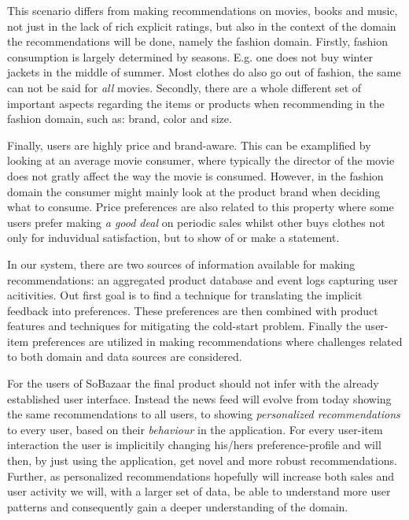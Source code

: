 This scenario differs from making recommendations on movies, books and music,
not just in the lack of rich explicit ratings, but also in the context of the
domain the recommendations will be done, namely the fashion domain. Firstly,
fashion consumption is largely determined by seasons. E.g. one does not buy
winter jackets in the middle of summer. Most clothes do also go out of
fashion, the same can not be said for \emph{all} movies. Secondly, there are a
whole different set of important aspects regarding the items or products when
recommending in the fashion domain, such as: brand, color and size. 

Finally, users are highly price and brand-aware. This can be examplified by
looking at an average movie consumer, where typically the director of the movie
does not gratly affect the way the movie is consumed. However, in the fashion
domain the consumer might mainly look at the product brand when deciding what
to consume. Price preferences are also related to this property where some
users prefer making \textit{a good deal} on periodic sales whilst other buys
clothes not only for induvidual satisfaction, but to show of or make a
statement.

In our system, there are two sources of information available for making
recommendations: an aggregated product database and event logs capturing user
acitivities. Out first goal is to find a technique for translating the implicit
feedback into preferences. These preferences are then combined with product
features and techniques for mitigating the cold-start problem. Finally the
user-item preferences are utilized in making recommendations where challenges
related to both domain and data sources are considered.

For the users of SoBazaar the final product should not infer with the already
established user interface. Instead the news feed will evolve from today
showing the same recommendations to all users, to showing \textit{personalized
recommendations} to every user, based on their \textit{behaviour} in the
application. For every user-item interaction the user is implicitily changing
his/hers preference-profile and will then, by just using the application, get
novel and more robust recommendations. Further, as personalized recommendations
hopefully will increase both sales and user activity we will, with a larger set
of data, be able to understand more user patterns and consequently gain a
deeper understanding of the domain.

